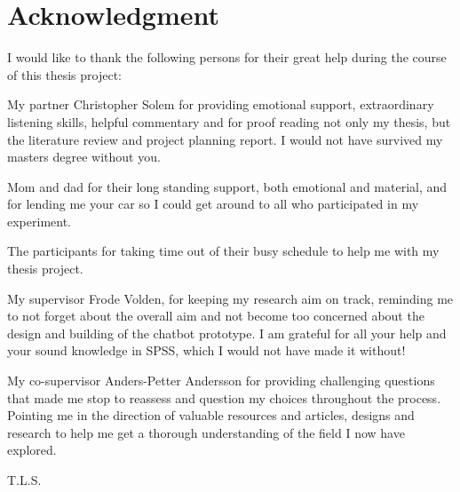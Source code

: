\chapter*{Acknowledgment}
I would like to thank the following persons for their great help during the course of this thesis project:

\vspace{5mm}

My partner Christopher Solem for providing emotional support, extraordinary listening skills, helpful commentary and for proof reading not only my thesis, but the literature review and project planning report. I would not have survived my masters degree without you.

\vspace{5mm}

Mom and dad for their long standing support, both emotional and material, and for lending me your car so I could get around to all who participated in my experiment.

\vspace{5mm}

The participants for taking time out of their busy schedule to help me with my thesis project.

\vspace{5mm}

My supervisor Frode Volden, for keeping my research aim on track, reminding me to not forget about the overall aim and not become too concerned about the design and building of the chatbot prototype. I am grateful for all your help and your sound knowledge in SPSS, which I would not have made it without!

\vspace{5mm}

My co-supervisor Anders-Petter Andersson for providing challenging questions that made me stop to reassess and question my choices throughout the process. Pointing me in the direction of valuable resources and articles, designs and research to help me get a thorough understanding of the field I now have explored.

\begin{flushright}
T.L.S.\\[1pc]
\end{flushright}